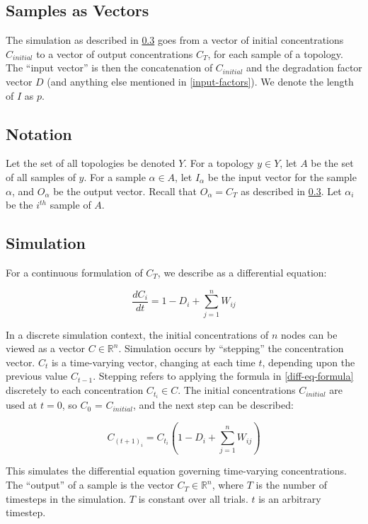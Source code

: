 \documentclass{article}
\begin{document}
\subsection{Samples as Vectors}
The simulation as described in \ref{simulation} goes from a vector of initial concentrations $C_{initial}$ to a vector of output concentrations $C_T$, for each sample of a topology. The ``input vector'' is then the concatenation of $C_{initial}$ and the degradation factor vector $D$ (and anything else mentioned in \ref{input-factors}). We denote the length of $I$ as $p$.

\subsection{Notation}

Let the set of all topologies be denoted $Y$. For a topology $y \in Y$, let $A$ be the set of all samples of $y$. For a sample $\alpha \in A$, let $I_{\alpha}$ be the input vector for the sample $\alpha$, and $O_{\alpha}$ be the output vector. Recall that $O_{\alpha} = C_T$ as described in \ref{simulation}. Let $\alpha_i$ be the $i^{th}$ sample of $A$.

\subsection{Simulation} \label{simulation}
For a continuous formulation of $C_T$, we describe as a differential equation:

\begin{equation} \label{diff-eq-formula}
  \frac{dC_i}{dt} = 1 - D_i + \sum_{j = 1}^n{W_{ij}}
\end{equation}

In a discrete simulation context, the initial concentrations of $n$ nodes can be viewed as a vector $C \in \mathbb{R}^n$. Simulation occurs by ``stepping'' the concentration vector. $C_t$ is a time-varying vector, changing at each time $t$, depending upon the previous value $C_{t - 1}$. Stepping refers to applying the formula in \eqref{diff-eq-formula} discretely to each concentration $C_{t_i} \in C$. The initial concentrations $C_{initial}$ are used at $t = 0$, so $C_0$ = $C_{initial}$, and the next step can be described:

\begin{equation} \label{timestep-formula}
  C_{{(t + 1)}_i} = C_{t_i} (1 - D_i + \sum_{j = 1}^n{W_{ij}})
\end{equation}

This simulates the differential equation governing time-varying concentrations. The ``output'' of a sample is the vector $C_T \in \mathbb{R}^n$, where $T$ is the number of timesteps in the simulation. $T$ is constant over all trials. $t$ is an arbitrary timestep.
\end{document}
